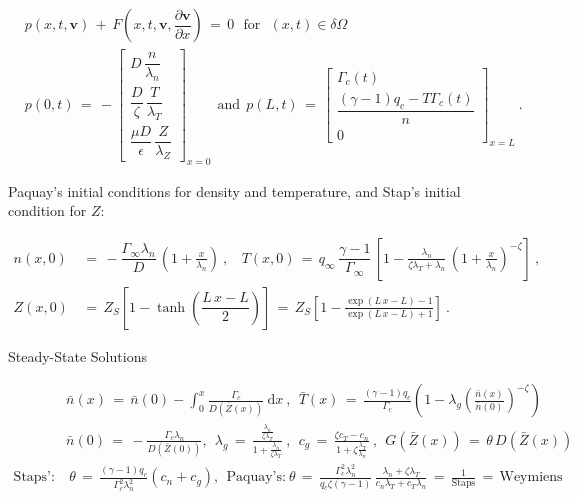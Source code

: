 \documentclass[a4paper,8pt]{article}
\begin{document}
\begin{align}
    &p\left(x, t, \mathbf{v}\right) \,+\, F\left(x, t, \mathbf{v}, \dfrac{\partial\mathbf{v}}{\partial x}\right) \,=\, 0 ~~~ \text{for} ~~~ (x, t) \in \delta\Omega \\
&p(0, t) \,=\, -\begin{bmatrix}
                D \, \dfrac{n}{\lambda_n}\\[2ex]
                \dfrac{D}{\zeta} \, \dfrac{T}{\lambda_T} \\[2ex]
                \dfrac{\mu D}{\epsilon} \, \dfrac{Z}{\lambda_Z}
                \end{bmatrix}_{x = 0}
~~ \text{and} ~~
p(L, t) \,=\, \begin{bmatrix}
                \Gamma_c(t) \\[1ex]
                \dfrac{(\gamma - 1) q_c - T\Gamma_c(t)}{n} \\[2ex]
                0
                \end{bmatrix}_{x=L}~.
\end{align}

\normalsize

Paquay's initial conditions for density and temperature, and Stap's
initial condition for \(Z\): \small

\begin{align}
    n(x,0) \,&=\, -\dfrac{\Gamma_\infty \lambda_n}{D} \, \left(1 + \frac{x}{\lambda_n}\right)~,
        ~~~~ T(x,0) \,=\, q_\infty \, \dfrac{\gamma - 1}{\Gamma_\infty} \, \left[1 - \frac{\lambda_n}{\zeta \lambda_T + \lambda_n} \, \left(1 + \frac{x}{\lambda_n}\right)^{-\zeta}\right]~, \\
    Z(x,0) \,&=\, Z_S\left[1 - \tanh\left(\dfrac{L\,x - L}{2}\right)\right] \,=\, Z_S\left[1 - \frac{\exp(L\,x - L) - 1}{\exp(L\,x - L) + 1}\right]~.
\end{align}

\normalsize

Steady-State Solutions \small

\begin{align}
    &\bar{n}(x) \,=\, \bar{n}(0) - \int_0^x \frac{\Gamma_c}{D(\bar{Z}(x))}~\text{d}x~,
        ~~ \bar{T}(x) \,=\, \frac{(\gamma - 1) q_c}{\Gamma_c} \left(1 - \lambda_g\left(\frac{\bar{n}(x)}{\bar{n}(0)}\right)^{-\zeta}\right) \\
    &\bar{n}(0) \,=\, -\frac{\Gamma_c \lambda_n}{D(\bar{Z}(0))},
        ~~ \lambda_g \,=\, \frac{\frac{\lambda_n}{\zeta \lambda_T}}{1 + \frac{\lambda_n}{\zeta \lambda_T}}~,
        ~~ c_g \,=\, \frac{\zeta c_T - c_n}{1 + \zeta \frac{\lambda_T}{\lambda_n}}~, ~~ G(\bar{Z}(x)) \,=\, \theta\,D(\bar{Z}(x)) \\
    \text{Staps':}& ~ \theta \,=\, \frac{(\gamma - 1) q_c}{\Gamma_c^2 \lambda_n^2} (c_n + c_g), ~~ \text{Paquay's:} ~ \theta \,=\, \frac{\Gamma_c^2 \lambda_n^2}{q_c \zeta (\gamma - 1)} \, \frac{\lambda_n + \zeta\lambda_T}{c_n\lambda_T + c_T\lambda_n} \,=\, \frac{1}{\text{Staps}} \,=\, \text{Weymiens}
\end{align}
\end{document}
